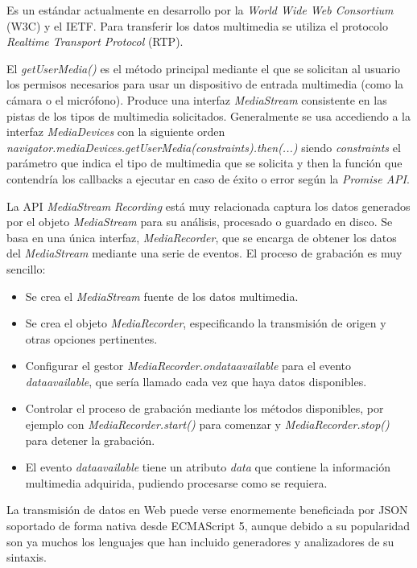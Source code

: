 Es un estándar actualmente en desarrollo por la \emph{World Wide Web Consortium} (\acrshort{W3C}) y el IETF. Para transferir los datos multimedia se utiliza el protocolo \emph{Realtime Transport Protocol }(\acrshort{RTP}).

El \emph{getUserMedia()} es el método principal mediante el que se solicitan al usuario los permisos necesarios para usar un dispositivo de entrada multimedia (como la cámara o el micrófono). Produce una interfaz \emph{MediaStream} consistente en las pistas de los tipos de multimedia solicitados. Generalmente se usa accediendo a la interfaz \emph{MediaDevices} con la siguiente orden \emph{navigator.mediaDevices.getUserMedia(constraints).then(...)} siendo \emph{constraints} el parámetro que indica el tipo de multimedia que se solicita y then la función que contendría los callbacks a ejecutar en caso de éxito o error según la \emph{Promise API}.

La API \emph{MediaStream Recording} está muy relacionada captura los datos generados por el objeto \emph{MediaStream} para su análisis, procesado o guardado en disco. Se basa en una única interfaz, \emph{MediaRecorder}, que se encarga de obtener los datos del \emph{MediaStream} mediante una serie de eventos. El proceso de grabación es muy sencillo:

\begin{itemize}
\item Se crea el \emph{MediaStream} fuente de los datos multimedia.
\item Se crea el objeto \emph{MediaRecorder}, especificando la transmisión de origen y otras opciones pertinentes.
\item Configurar el gestor \emph{MediaRecorder.ondataavailable} para el evento \emph{dataavailable}, que sería llamado cada vez que haya datos disponibles.
\item Controlar el proceso de grabación mediante los métodos disponibles, por ejemplo con \emph{MediaRecorder.start()} para comenzar y \emph{MediaRecorder.stop()} para detener la grabación.
\item El evento \emph{dataavailable} tiene un atributo \emph{data} que contiene la información multimedia adquirida, pudiendo procesarse como se requiera.
\end{itemize}

La transmisión de datos en Web puede verse enormemente beneficiada por JSON soportado de forma nativa desde ECMAScript 5, aunque debido a su popularidad son ya muchos los lenguajes que han incluido generadores y analizadores de su sintaxis.


